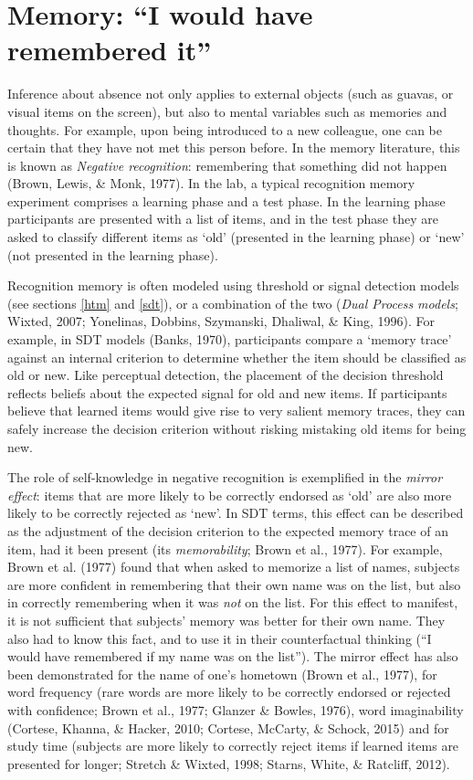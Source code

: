 \documentclass[12pt,twoside]{reedthesis}
\begin{document}
\hypertarget{memory-i-would-have-remembered-it}{%
\section{Memory: ``I would have remembered it''}\label{memory-i-would-have-remembered-it}}

Inference about absence not only applies to external objects (such as guavas, or visual items on the screen), but also to mental variables such as memories and thoughts. For example, upon being introduced to a new colleague, one can be certain that they have not met this person before. In the memory literature, this is known as \emph{Negative recognition}: remembering that something did not happen (Brown, Lewis, \& Monk, 1977). In the lab, a typical recognition memory experiment comprises a learning phase and a test phase. In the learning phase participants are presented with a list of items, and in the test phase they are asked to classify different items as `old' (presented in the learning phase) or `new' (not presented in the learning phase).

Recognition memory is often modeled using threshold or signal detection models (see sections \ref{htm} and \ref{sdt}), or a combination of the two (\emph{Dual Process models}; Wixted, 2007; Yonelinas, Dobbins, Szymanski, Dhaliwal, \& King, 1996). For example, in SDT models (Banks, 1970), participants compare a `memory trace' against an internal criterion to determine whether the item should be classified as old or new. Like perceptual detection, the placement of the decision threshold reflects beliefs about the expected signal for old and new items. If participants believe that learned items would give rise to very salient memory traces, they can safely increase the decision criterion without risking mistaking old items for being new.

The role of self-knowledge in negative recognition is exemplified in the \emph{mirror effect}: items that are more likely to be correctly endorsed as `old' are also more likely to be correctly rejected as `new'. In SDT terms, this effect can be described as the adjustment of the decision criterion to the expected memory trace of an item, had it been present (its \emph{memorability}; Brown et al., 1977). For example, Brown et al. (1977) found that when asked to memorize a list of names, subjects are more confident in remembering that their own name was on the list, but also in correctly remembering when it was \emph{not} on the list. For this effect to manifest, it is not sufficient that subjects' memory was better for their own name. They also had to know this fact, and to use it in their counterfactual thinking (``I would have remembered if my name was on the list''). The mirror effect has also been demonstrated for the name of one's hometown (Brown et al., 1977), for word frequency (rare words are more likely to be correctly endorsed or rejected with confidence; Brown et al., 1977; Glanzer \& Bowles, 1976), word imaginability (Cortese, Khanna, \& Hacker, 2010; Cortese, McCarty, \& Schock, 2015) and for study time (subjects are more likely to correctly reject items if learned items are presented for longer; Stretch \& Wixted, 1998; Starns, White, \& Ratcliff, 2012).
\end{document}
